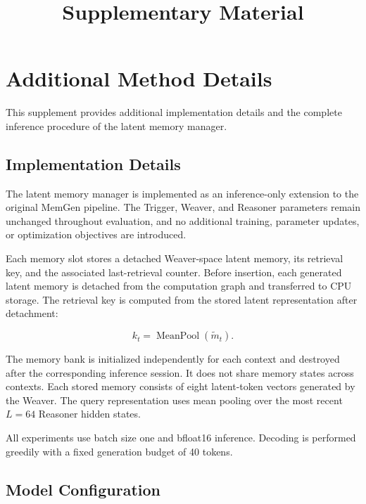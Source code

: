 \documentclass[letterpaper]{article}
\title{Supplementary Material }
\author{}
\begin{document}
\maketitle


\section{Additional Method Details}
\label{sec:supp-method}

This supplement provides additional implementation details and the complete
inference procedure of the latent memory manager.


\subsection{Implementation Details}
\label{sec:supp-implementation}

The latent memory manager is implemented as an inference-only extension
to the original MemGen pipeline. The Trigger, Weaver, and Reasoner
parameters remain unchanged throughout evaluation, and no additional
training, parameter updates, or optimization objectives are introduced.

Each memory slot stores a detached Weaver-space latent memory, its
retrieval key, and the associated last-retrieval counter. Before insertion,
each generated latent memory is detached from the computation graph and
transferred to CPU storage. The retrieval key is computed from the stored
latent representation after detachment:

\[
k_t =
\operatorname{MeanPool}(\widetilde{m}_t).
\]

The memory bank is initialized independently for each context and destroyed
after the corresponding inference session. It does not share memory states
across contexts. Each stored memory consists of eight latent-token vectors
generated by the Weaver. The query representation uses mean pooling over
the most recent \(L=64\) Reasoner hidden states.

All experiments use batch size one and bfloat16 inference. Decoding is
performed greedily with a fixed generation budget of 40 tokens.


\subsection{Model Configuration}
\label{sec:supp-model}

\end{document}
